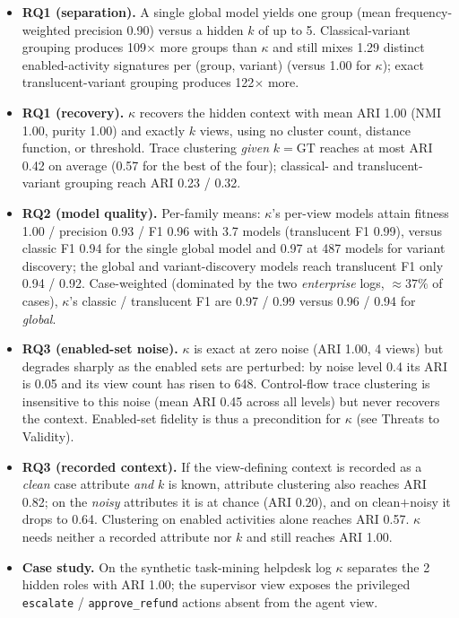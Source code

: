 \begin{itemize}
\item \textbf{RQ1 (separation).} A single global model yields one group (mean frequency-weighted precision 0.90) versus a hidden $k$ of up to 5. Classical-variant grouping produces 109$\times$ more groups than $\kappa$ and still mixes 1.29 distinct enabled-activity signatures per (group, variant) (versus 1.00 for $\kappa$); exact translucent-variant grouping produces 122$\times$ more.
\item \textbf{RQ1 (recovery).} $\kappa$ recovers the hidden context with mean ARI 1.00 (NMI 1.00, purity 1.00) and exactly $k$ views, using no cluster count, distance function, or threshold. Trace clustering \emph{given} $k=\mathrm{GT}$ reaches at most ARI 0.42 on average (0.57 for the best of the four); classical- and translucent-variant grouping reach ARI 0.23 / 0.32.
\item \textbf{RQ2 (model quality).} Per-family means: $\kappa$'s per-view models attain fitness 1.00 / precision 0.93 / F1 0.96 with 3.7 models (translucent F1 0.99), versus classic F1 0.94 for the single global model and 0.97 at 487 models for variant discovery; the global and variant-discovery models reach translucent F1 only 0.94 / 0.92. Case-weighted (dominated by the two \emph{enterprise} logs, $\approx$$37\%$ of cases), $\kappa$'s classic / translucent F1 are 0.97 / 0.99 versus 0.96 / 0.94 for \emph{global}.
\item \textbf{RQ3 (enabled-set noise).} $\kappa$ is exact at zero noise (ARI 1.00, 4 views) but degrades sharply as the enabled sets are perturbed: by noise level 0.4 its ARI is 0.05 and its view count has risen to 648. Control-flow trace clustering is insensitive to this noise (mean ARI 0.45 across all levels) but never recovers the context. Enabled-set fidelity is thus a precondition for $\kappa$ (see Threats to Validity).
\item \textbf{RQ3 (recorded context).} If the view-defining context is recorded as a \emph{clean} case attribute \emph{and} $k$ is known, attribute clustering also reaches ARI 0.82; on the \emph{noisy} attributes it is at chance (ARI 0.20), and on clean$+$noisy it drops to 0.64. Clustering on enabled activities alone reaches ARI 0.57. $\kappa$ needs neither a recorded attribute nor $k$ and still reaches ARI 1.00.
\item \textbf{Case study.} On the synthetic task-mining helpdesk log $\kappa$ separates the 2 hidden roles with ARI 1.00; the supervisor view exposes the privileged \texttt{escalate} / \texttt{approve\_refund} actions absent from the agent view.
\end{itemize}
